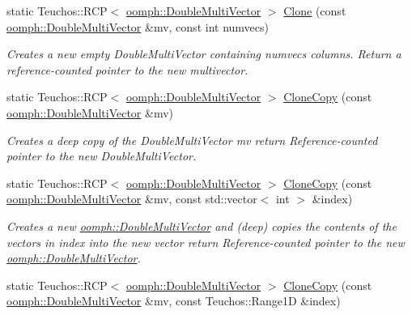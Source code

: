 \begin{DoxyCompactItemize}
\item 
static Teuchos\+::\+R\+CP$<$ \hyperlink{classoomph_1_1DoubleMultiVector}{oomph\+::\+Double\+Multi\+Vector} $>$ \hyperlink{classAnasazi_1_1MultiVecTraits_3_01double_00_01oomph_1_1DoubleMultiVector_01_4_ab98d6c0005dd90d02ddb1d89b2d425bc}{Clone} (const \hyperlink{classoomph_1_1DoubleMultiVector}{oomph\+::\+Double\+Multi\+Vector} \&mv, const int numvecs)
\begin{DoxyCompactList}\small\item\em Creates a new empty Double\+Multi\+Vector containing numvecs columns. Return a reference-\/counted pointer to the new multivector. \end{DoxyCompactList}\item 
static Teuchos\+::\+R\+CP$<$ \hyperlink{classoomph_1_1DoubleMultiVector}{oomph\+::\+Double\+Multi\+Vector} $>$ \hyperlink{classAnasazi_1_1MultiVecTraits_3_01double_00_01oomph_1_1DoubleMultiVector_01_4_a03107073812d276e6b2ad3cf38feefce}{Clone\+Copy} (const \hyperlink{classoomph_1_1DoubleMultiVector}{oomph\+::\+Double\+Multi\+Vector} \&mv)
\begin{DoxyCompactList}\small\item\em Creates a deep copy of the Double\+Multi\+Vector mv return Reference-\/counted pointer to the new Double\+Multi\+Vector. \end{DoxyCompactList}\item 
static Teuchos\+::\+R\+CP$<$ \hyperlink{classoomph_1_1DoubleMultiVector}{oomph\+::\+Double\+Multi\+Vector} $>$ \hyperlink{classAnasazi_1_1MultiVecTraits_3_01double_00_01oomph_1_1DoubleMultiVector_01_4_a162bfdbe0f88da69cb38aa3f8d3f4d50}{Clone\+Copy} (const \hyperlink{classoomph_1_1DoubleMultiVector}{oomph\+::\+Double\+Multi\+Vector} \&mv, const std\+::vector$<$ int $>$ \&index)
\begin{DoxyCompactList}\small\item\em Creates a new \hyperlink{classoomph_1_1DoubleMultiVector}{oomph\+::\+Double\+Multi\+Vector} and (deep) copies the contents of the vectors in index into the new vector return Reference-\/counted pointer to the new \hyperlink{classoomph_1_1DoubleMultiVector}{oomph\+::\+Double\+Multi\+Vector}. \end{DoxyCompactList}\item 
static Teuchos\+::\+R\+CP$<$ \hyperlink{classoomph_1_1DoubleMultiVector}{oomph\+::\+Double\+Multi\+Vector} $>$ \hyperlink{classAnasazi_1_1MultiVecTraits_3_01double_00_01oomph_1_1DoubleMultiVector_01_4_aee537f70bf569a969e3eab89f538588d}{Clone\+Copy} (const \hyperlink{classoomph_1_1DoubleMultiVector}{oomph\+::\+Double\+Multi\+Vector} \&mv, const Teuchos\+::\+Range1D \&index)

\end{DoxyCompactItemize}
